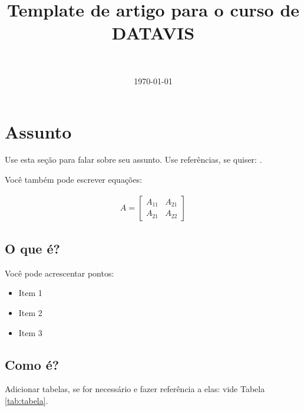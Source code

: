 \documentclass[10pt, a4paper, twocolumn]{article}
\title{Template de artigo para o curso de DATAVIS} %
\author{
	\authorstyle{Augustus Norius\textsuperscript{1,2}} \\ %
}
\date{\today}
\begin{document}
\maketitle %
\thispagestyle{firstpage} 





\section*{Assunto}

Use esta seção para falar sobre seu assunto. Use referências, se quiser: \citep{ref1} \citep{ref2}. 

Você também pode escrever equações:

\lipsum[1-2]

\begin{align}
	A = 
	\begin{bmatrix}
		A_{11} & A_{21} \\
		A_{21} & A_{22}
	\end{bmatrix}
\end{align}

\lipsum[1]

\subsection*{O que é?}

Você pode acrescentar pontos:

\begin{itemize}
	\item Item 1
	\item Item 2
	\item Item 3
\end{itemize}

\subsection*{Como é?}

Adicionar tabelas, se for necessário e fazer referência a elas: vide Tabela \ref{tab:tabela}.
\end{document}

